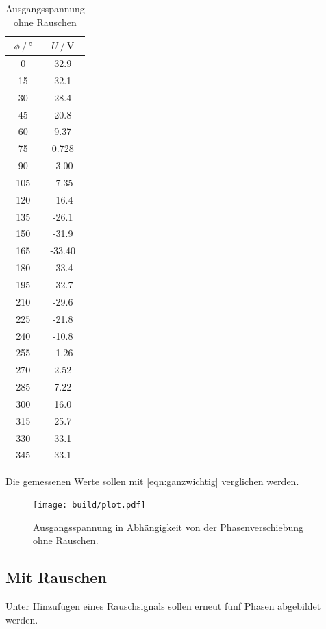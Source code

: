 \begin{table}
  \centering
  \caption{Ausgangsspannung ohne Rauschen}
  \label{tab:ohne_Rauschen}
  \begin{tabular}{cc}
    \toprule {$\phi \:/\: °$} & {$U \:/\: \si{\volt}$} \\
    \midrule
     0  & 32.9  \\
     15  & 32.1  \\
     30 & 28.4 \\
     45 & 20.8 \\
     60 & 9.37 \\
     75 & 0.728\\
     90 & -3.00 \\
     105 & -7.35  \\
     120 & -16.4 \\
     135 & -26.1 \\
     150 & -31.9  \\
     165 & -33.40 \\
     180 & -33.4  \\
     195 & -32.7  \\
     210 & -29.6  \\
     225 & -21.8  \\
     240 & -10.8\\
     255 & -1.26  \\
     270 & 2.52  \\
     285 & 7.22  \\
     300 & 16.0 \\
     315 & 25.7 \\
     330 & 33.1 \\
     345 & 33.1 \\
\bottomrule
\end{tabular}
\end{table}

Die gemessenen Werte sollen mit \ref{eqn:ganzwichtig} verglichen werden.

\begin{figure}
  \centering
  \texttt{[image: build/plot.pdf]}
\caption{Ausgangsspannung in Abhängigkeit von der Phasenverschiebung ohne Rauschen.}
  \label{fig:ohne_rauschen}
\end{figure}

 \subsection {Mit Rauschen}
 Unter Hinzufügen eines Rauschsignals sollen erneut fünf Phasen abgebildet werden.

